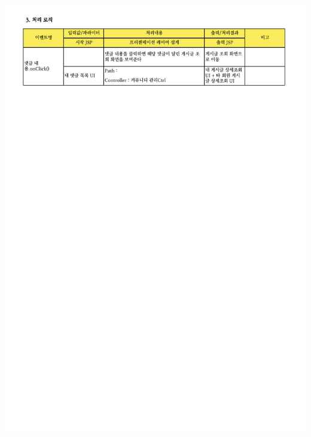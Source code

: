 {{{{{{{{{{{{{{{{{{{{{{{{{{{{{{{{{{{{{{{{{{{{{{{\includegraphics[width=20cm]{./Figure/Analysis/Display/community/community_06.pdf} \\
}}}}}}}}}}}}}}}}}}}}}}}}}}}}}}}}}}}}}}}}}}}}}}}
